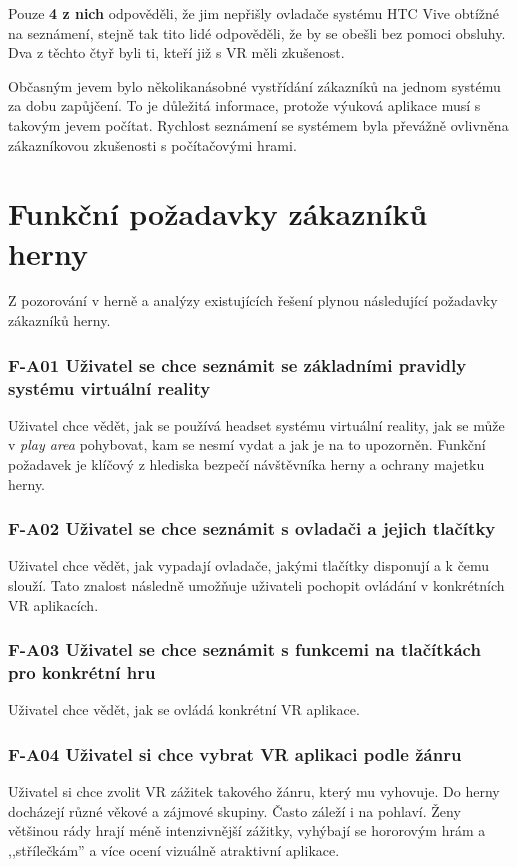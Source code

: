 Pouze \textbf{4 z nich} odpověděli, že jim nepřišly ovladače systému HTC
Vive obtížné na seznámení, stejně tak tito lidé odpověděli, že by se
obešli bez pomoci obsluhy. Dva z těchto čtyř byli ti, kteří již s VR
měli zkušenost.

Občasným jevem bylo několikanásobné vystřídání zákazníků na jednom
systému za dobu zapůjčení. To je důležitá informace, protože výuková
aplikace musí s takovým jevem počítat. Rychlost seznámení se systémem
byla převážně ovlivněna zákazníkovou zkušenosti s počítačovými hrami.

\section{Funkční požadavky zákazníků
herny}\label{funkux10dnuxed-poux17eadavky-zakazniku-herny}

Z pozorování v herně a analýzy existujících řešení plynou následující
požadavky zákazníků herny.

\subsubsection*{F-A01 Uživatel se chce seznámit se základními pravidly systému
virtuální reality}
Uživatel chce vědět, jak se používá headset systému virtuální reality,
jak se může v \emph{play area} pohybovat, kam se nesmí vydat a jak je na
to upozorněn. Funkční požadavek je klíčový z hlediska bezpečí
návštěvníka herny a ochrany majetku herny.

\subsubsection*{F-A02 Uživatel se chce seznámit s ovladači a jejich tlačítky}
Uživatel chce vědět, jak vypadají ovladače, jakými tlačítky disponují a
k čemu slouží. Tato znalost následně umožňuje uživateli pochopit ovládání v konkrétních VR aplikacích.

\subsubsection*{F-A03 Uživatel se chce seznámit s funkcemi na tlačítkách pro
konkrétní hru}
Uživatel chce vědět, jak se ovládá konkrétní VR aplikace.

\subsubsection*{F-A04 Uživatel si chce vybrat VR aplikaci podle žánru}
Uživatel si chce zvolit VR zážitek takového žánru, který mu vyhovuje. Do
herny docházejí různé věkové a zájmové skupiny. Často záleží i na
pohlaví. Ženy většinou rády hrají méně intenzivnější zážitky, vyhýbají
se hororovým hrám a ,,střílečkám'' a více ocení vizuálně atraktivní
aplikace. \autocite{ladiespreferences}

